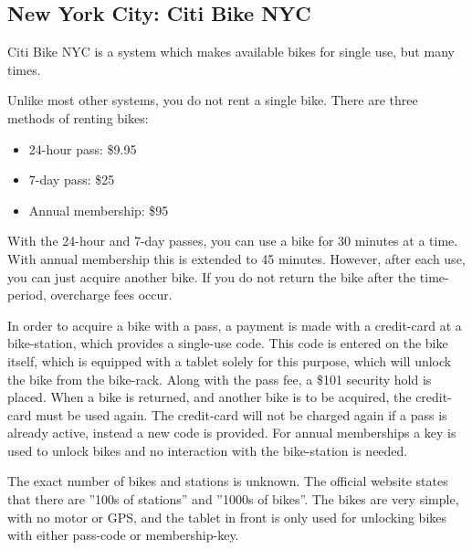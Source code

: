 \subsection{New York City: Citi Bike NYC}
Citi Bike NYC\cite{nyc_citibike} is a system which makes available bikes for single use, but many times.

Unlike most other systems, you do not rent a single bike.
There are three methods of renting bikes:

\begin{itemize}
\item 24-hour pass: \$9.95
\item 7-day pass: \$25
\item Annual membership: \$95
\end{itemize}

With the 24-hour and 7-day passes, you can use a bike for 30 minutes at a time.
With annual membership this is extended to 45 minutes.
However, after each use, you can just acquire another bike.
If you do not return the bike after the time-period, overcharge fees occur.

In order to acquire a bike with a pass, a payment is made with a credit-card at a bike-station, which provides a single-use code.
This code is entered on the bike itself, which is equipped with a tablet solely for this purpose, which will unlock the bike from the bike-rack.
Along with the pass fee, a \$101 security hold is placed.
When a bike is returned, and another bike is to be acquired, the credit-card must be used again.
The credit-card will not be charged again if a pass is already active, instead a new code is provided.
For annual memberships a key is used to unlock bikes and no interaction with the bike-station is needed.

The exact number of bikes and stations is unknown.
The official website states that there are ''100s of stations'' and ''1000s of bikes''.
The bikes are very simple, with no motor or GPS, and the tablet in front is only used for unlocking bikes with either pass-code or membership-key.